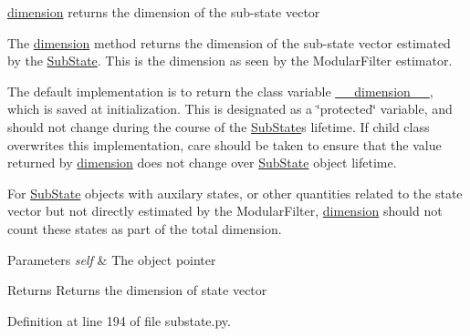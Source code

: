 \hyperlink{classmodest_1_1substates_1_1substate_1_1SubState_ab9027f6d1d7d57c47731612f519b7ee6}{dimension} returns the dimension of the sub-\/state vector 

The \hyperlink{classmodest_1_1substates_1_1substate_1_1SubState_ab9027f6d1d7d57c47731612f519b7ee6}{dimension} method returns the dimension of the sub-\/state vector estimated by the \hyperlink{classmodest_1_1substates_1_1substate_1_1SubState}{Sub\+State}. This is the dimension as seen by the Modular\+Filter estimator.

The default implementation is to return the class variable \hyperlink{classmodest_1_1substates_1_1substate_1_1SubState_a5b1c0756a69da7f293a415c7d2d77843}{\+\_\+\+\_\+dimension\+\_\+\+\_\+}, which is saved at initialization. This is designated as a \char`\"{}protected\char`\"{} variable, and should not change during the course of the \hyperlink{classmodest_1_1substates_1_1substate_1_1SubState}{Sub\+State}\textquotesingle{}s lifetime. If child class overwrites this implementation, care should be taken to ensure that the value returned by \hyperlink{classmodest_1_1substates_1_1substate_1_1SubState_ab9027f6d1d7d57c47731612f519b7ee6}{dimension} does not change over \hyperlink{classmodest_1_1substates_1_1substate_1_1SubState}{Sub\+State} object lifetime.

For \hyperlink{classmodest_1_1substates_1_1substate_1_1SubState}{Sub\+State} objects with auxilary states, or other quantities related to the state vector but not directly estimated by the Modular\+Filter, \hyperlink{classmodest_1_1substates_1_1substate_1_1SubState_ab9027f6d1d7d57c47731612f519b7ee6}{dimension} should not count these states as part of the total dimension.


\begin{DoxyParams}{Parameters}
{\em self} & The object pointer\\
\hline
\end{DoxyParams}
\begin{DoxyReturn}{Returns}
Returns the dimension of state vector 
\end{DoxyReturn}


Definition at line 194 of file substate.\+py.

